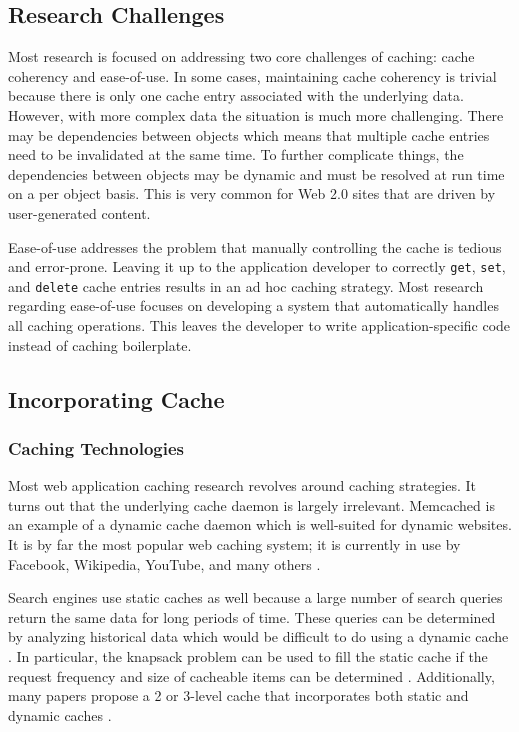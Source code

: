 \documentclass[12pt]{ucthesis}
\begin{document}
\subsection{Research Challenges}
Most research is focused on addressing two core challenges of caching: cache coherency and ease-of-use.
In some cases, maintaining cache coherency is trivial because there is only one cache entry associated with the underlying data.
However, with more complex data the situation is much more challenging.
There may be dependencies between objects which means that multiple cache entries need to be invalidated at the same time.
To further complicate things, the dependencies between objects may be dynamic and must be resolved at run time on a per object basis.
This is very common for Web 2.0 sites that are driven by user-generated content.

Ease-of-use addresses the problem that manually controlling the cache is tedious and error-prone.
Leaving it up to the application developer to correctly {\tt get}, {\tt set}, and {\tt delete} cache entries results in an ad hoc caching strategy.
Most research regarding ease-of-use focuses on developing a system that automatically handles all caching operations.
This leaves the developer to write application-specific code instead of caching boilerplate.

\subsection{Incorporating Cache}
\subsubsection{Caching Technologies}
Most web application caching research revolves around caching strategies.
It turns out that the underlying cache daemon is largely irrelevant.
\textsf{Memcached} is an example of a dynamic cache daemon which is well-suited for dynamic websites.
It is by far the most popular web caching system; it is currently in use by \textsf{Facebook}, \textsf{Wikipedia}, \textsf{YouTube}, and many others \cite{memcachedDotOrg}.

Search engines use static caches as well because a large number of search queries return the same data for long periods of time.
These queries can be determined by analyzing historical data which would be difficult to do using a dynamic cache \cite{designTradeOffsSearchEngine}.
In particular, the knapsack problem can be used to fill the static cache if the request frequency and size of cacheable items can be determined \cite{designTradeOffsSearchEngine}.
Additionally, many papers propose a 2 or 3-level cache that incorporates both static and dynamic caches \cite{cacheAdmissionPolicies, designTradeOffsSearchEngine}.
\end{document}
